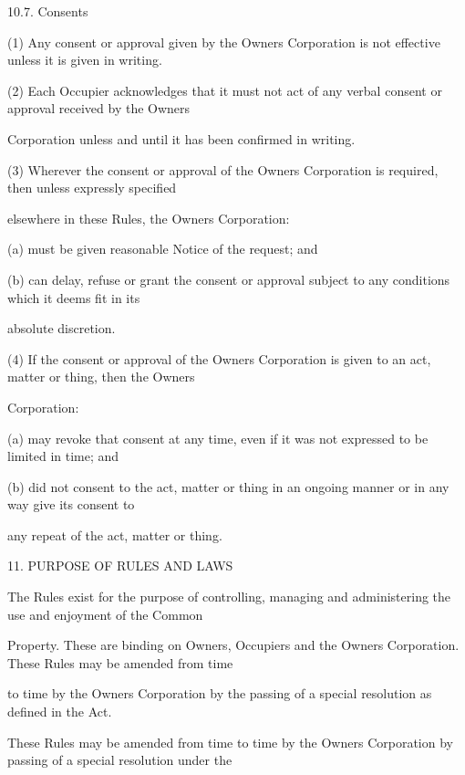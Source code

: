\documentclass{article}
\begin{document}
{\fontsize{9.99}{1}10.7. Consents }

{\fontsize{9.962}{1}(1) Any consent or approval given by the Owners Corporation is not effective unless it is given in writing. }


{\fontsize{9.962}{1}(2) Each Occupier acknowledges that it must not act of any verbal consent or approval received by the Owners }

{\fontsize{10.02}{1}Corporation unless and until it has been confirmed in writing. }

{\fontsize{9.962}{1}(3) Wherever the consent or approval of the Owners Corporation is required, then unless expressly specified }

{\fontsize{10.02}{1}elsewhere in these Rules, the Owners Corporation: }

{\fontsize{9.962}{1}(a) must be given reasonable Notice of the request; and }

{\fontsize{9.962}{1}(b) can delay, refuse or grant the consent or approval subject to any conditions which it deems fit in its }

{\fontsize{10.02}{1}absolute discretion. }

{\fontsize{9.962}{1}(4) If the consent or approval of the Owners Corporation is given to an act, matter or thing, then the Owners }

{\fontsize{10.02}{1}Corporation: }

{\fontsize{9.962}{1}(a) may revoke that consent at any time, even if it was not expressed to be limited in time; and }

{\fontsize{9.962}{1}(b) did not consent to the act, matter or thing in an ongoing manner or in any way give its consent to }

{\fontsize{10.02}{1}any repeat of the act, matter or thing. }


{\fontsize{9.99}{1}11. PURPOSE OF RULES AND LAWS }

{\fontsize{10.02}{1}The Rules exist for the purpose of controlling, managing and administering the use and enjoyment of the Common }

{\fontsize{10.02}{1}Property. These are binding on Owners, Occupiers and the Owners Corporation. These Rules may be amended from time }

{\fontsize{10.02}{1}to time by the Owners Corporation by the passing of a special resolution as defined in the Act. }

{\fontsize{10.02}{1}These Rules may be amended from time to time by the Owners Corporation by passing of a special resolution under the }
\end{document}
